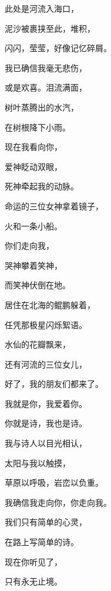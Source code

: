 \documentclass[UTF8]{article}
\begin{document}
\par 此处是河流入海口，
\par 泥沙被裹挟至此，堆积，
\par 闪闪，莹莹，好像记忆碎屑。
\par 我已确信我毫无悲伤，
\par 或是欢喜。泪流满面，
\par 树叶蒸腾出的水汽，
\par 在树根降下小雨。
\par 现在我看向你，
\par 爱神眨动双眼，
\par 死神牵起我的动脉。
\par 命运的三位女神拿着镜子，
\par 火和一条小船。
\par 你们走向我，
\par 哭神攀着笑神，
\par 而笑神伏倒在地。
\par 居住在北海的鲲鹏躲着，
\par 任凭那极星闪烁絮语。
\par 水仙的花瓣飘来，
\par 还有河流的三位女儿，
\par 好了，我的朋友们都来了。
\par 我就是你，我爱着你。
\par 你就是诗，我也是诗。
\par 我与诗人以目光相认，
\par 太阳与我以触摸，
\par 草原以呼吸，岩峦以负重。
\par 我确信我走向你，你走向我。
\par 我们只有简单的心灵，
\par 在路上写简单的诗。
\par 现在你听见了，
\par 只有永无止境。
\end{document}
